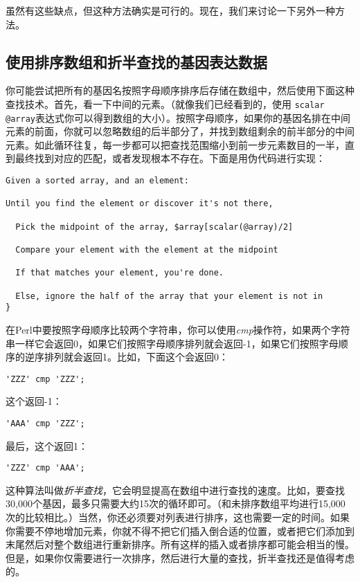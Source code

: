 虽然有这些缺点，但这种方法确实是可行的。现在，我们来讨论一下另外一种方法。

\subsection{使用排序数组和折半查找的基因表达数据}
你可能尝试把所有的基因名按照字母顺序排序后存储在数组中，然后使用下面这种查找技术。首先，看一下中间的元素。（就像我们已经看到的，使用 \verb|scalar @array|表达式你可以得到数组的大小）。按照字母顺序，如果你的基因名排在中间元素的前面，你就可以忽略数组的后半部分了，并找到数组剩余的前半部分的中间元素。如此循环往复，每一步都可以把查找范围缩小到前一步元素数目的一半，直到最终找到对应的匹配，或者发现根本不存在。下面是用伪代码进行实现：

\begin{lstlisting}
Given a sorted array, and an element:

Until you find the element or discover it's not there,

  Pick the midpoint of the array, $array[scalar(@array)/2]

  Compare your element with the element at the midpoint

  If that matches your element, you're done.

  Else, ignore the half of the array that your element is not in
}
\end{lstlisting}

在Perl中要按照字母顺序比较两个字符串，你可以使用\textit{cmp}操作符，如果两个字符串一样它会返回0，如果它们按照字母顺序排列就会返回-1，如果它们按照字母顺序的逆序排列就会返回1。比如，下面这个会返回0：

\begin{lstlisting}
'ZZZ' cmp 'ZZZ';
\end{lstlisting}

这个返回-1：

\begin{lstlisting}
'AAA' cmp 'ZZZ';
\end{lstlisting}

最后，这个返回1：

\begin{lstlisting}
'ZZZ' cmp 'AAA';
\end{lstlisting}

这种算法叫做\textit{折半查找}，它会明显提高在数组中进行查找的速度。比如，要查找30,000个基因，最多只需要大约15次的循环即可。（和未排序数组平均进行15,000次的比较相比。）当然，你还必须要对列表进行排序，这也需要一定的时间。如果你需要不停地增加元素，你就不得不把它们插入倒合适的位置，或者把它们添加到末尾然后对整个数组进行重新排序。所有这样的插入或者排序都可能会相当的慢。但是，如果你仅需要进行一次排序，然后进行大量的查找，折半查找还是值得考虑的。

